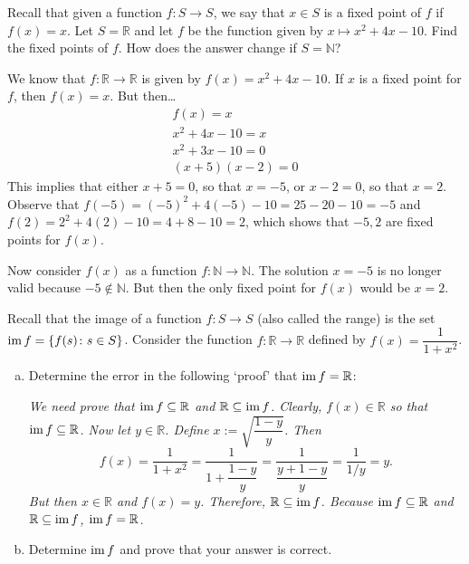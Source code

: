 \documentclass[11pt,letterpaper]{article}
\begin{document}
\newpage



 Recall that given a function $f: S \to S$, we say that $x \in S$ is a fixed point of $f$ if $f(x)= x$. Let $S= \mathbb{R}$ and let $f$ be the function given by $x \mapsto x^2 + 4x - 10$. Find the fixed points of $f$. How does the answer change if $S= \mathbb{N}$? \pspace

\sol We know that $f: \mathbb{R} \to \mathbb{R}$ is given by $f(x)= x^2 + 4x - 10$. If $x$ is a fixed point for $f$, then $f(x)= x$. But then\dots
	\[
	\begin{gathered}
	f(x)= x \\
	x^2 + 4x - 10= x \\
	x^2 + 3x - 10= 0 \\
	(x + 5)(x - 2)= 0 
	\end{gathered}
	\]
This implies that either $x + 5= 0$, so that $x= -5$, or $x - 2= 0$, so that $x= 2$. Observe that $f(-5)= (-5)^2 + 4(-5) - 10= 25 - 20 - 10= -5$ and $f(2)= 2^2 + 4(2) - 10= 4 + 8 - 10= 2$, which shows that $-5, 2$ are fixed points for $f(x)$. \pspace

Now consider $f(x)$ as a function $f: \mathbb{N} \to \mathbb{N}$. The solution $x= -5$ is no longer valid because $-5 \notin \mathbb{N}$. But then the only fixed point for $f(x)$ would be $x= 2$. 



\newpage



 Recall that the image of a function $f: S \to S$ (also called the range) is the set $\operatorname{im} f= \{ f(s) \colon s \in S \}$. Consider the function $f: \mathbb{R} \to \mathbb{R}$ defined by $f(x)= \dfrac{1}{1 + x^2}$. 
\begin{enumerate}[(a)]
\item Determine the error in the following `proof' that $\operatorname{im} f= \mathbb{R}$: \pspace

{\itshape We need prove that $\operatorname{im} f \subseteq \mathbb{R}$ and $\mathbb{R} \subseteq \operatorname{im} f$. Clearly, $f(x) \in \mathbb{R}$ so that $\operatorname{im} f \subseteq \mathbb{R}$. Now let $y \in \mathbb{R}$. Define $x:= \sqrt{\dfrac{1 - y}{y}}$. Then
	\[
	f(x)= \dfrac{1}{1 + x^2}= \dfrac{1}{1 + \dfrac{1 - y}{y}}= \dfrac{1}{\dfrac{y + 1 - y}{y}}= \dfrac{1}{1/y}= y.
	\]
But then $x \in \mathbb{R}$ and $f(x)= y$. Therefore, $\mathbb{R} \subseteq \operatorname{im} f$. Because $\operatorname{im} f \subseteq \mathbb{R}$ and $\mathbb{R} \subseteq \operatorname{im} f$, $\operatorname{im} f = \mathbb{R}$.}

\item Determine $\operatorname{im} f$ and prove that your answer is correct. 
\end{enumerate} \pspace
\end{document}
